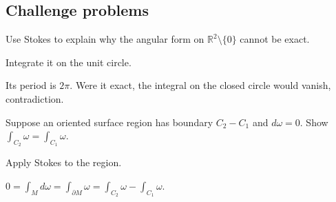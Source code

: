 \subsection*{Challenge problems}

\begin{exercise}\label{exr:vii11-ped-15}
Use Stokes to explain why the angular form on \(\mathbb R^2\setminus\{0\}\) cannot be exact.
\end{exercise}
\begin{hint}
Integrate it on the unit circle.
\end{hint}
\begin{solution}
Its period is \(2\pi\).  Were it exact, the integral on the closed circle would vanish, contradiction.
\end{solution}

\begin{exercise}\label{exr:vii11-ped-16}
Suppose an oriented surface region has boundary \(C_2-C_1\) and \(d\omega=0\).  Show \(\int_{C_2}\omega=\int_{C_1}\omega\).
\end{exercise}
\begin{hint}
Apply Stokes to the region.
\end{hint}
\begin{solution}
\(0=\int_Md\omega=\int_{\partial M}\omega=\int_{C_2}\omega-\int_{C_1}\omega\).
\end{solution}

